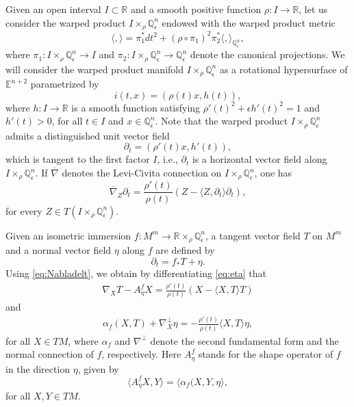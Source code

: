 \documentclass[11pt,a4paper]{article}
\numberwithin{equation}{section}
\newcommand{\R}{\mathbb{R}}
\newcommand{\Q}{\mathbb{Q}}
\newcommand{\E}{\mathbb{E}}
\newcommand{\e}{\epsilon}
\newcommand{\pie}{\langle}
\newcommand{\pid}{\rangle}
\newcommand{\WP}{\R\times_{\rho}\Q^n_{\epsilon}}
\newcommand{\IWP}{I\times_{\rho}\Q^n_{\epsilon}}
\newcommand{\co}{\colon}
\newcommand{\dt}{\partial_t}
\newcommand{\al}{\alpha}
\newcommand{\np}{\nabla^\perp}
\newcommand{\nb}{\overline\nabla}
\begin{document}
Given an open interval $I\subset\R$ and a smooth positive function $\rho\co I\to\R$, let us consider the warped product $\IWP$ endowed with the warped product metric
\[
\pie,\pid = \pi_1^\ast dt^2 + (\rho\circ\pi_1)^2\pi_2^\ast
\pie,\pid_{\Q^n_\e},
\]
where $\pi_1\co\IWP\to I$ and $\pi_2\co\IWP\to\Q^n_\e$ denote the canonical projections. We will consider the warped product manifold $\IWP$ as a rotational hypersurface of $\E^{n+2}$ parametrized by
\begin{equation} \label{eq:inclusion_i}
i(t,x) = (\rho(t)x,h(t)),    
\end{equation}
where $h\co I\to\R$ is a smooth function satisfying $\rho'(t)^2+\e h'(t)^2=1$ and $h'(t)>0$, for all $t\in I$ and $x\in\Q^n_\e$. Note that the warped product $\IWP$ admits a distinguished unit vector field
\[
\dt=(\rho'(t)x,h'(t)),
\]
which is tangent to the first factor $I$, i.e., $\dt$ is a horizontal vector field along $\IWP$. If $\nb$ denotes the Levi-Civita connection on $\IWP$, one has
\begin{equation} \label{eq:Nabladelt}
\nb_Z\dt = \frac{\rho'(t)}{\rho(t)}\left(Z-\pie Z,
\dt\pid\dt\right),
\end{equation}
for every $Z\in T(\IWP)$.

\vspace{.2cm}

Given an isometric immersion $f\co M^m\to\WP$, a tangent vector field $T$ on $M^m$ and a normal vector field $\eta$ along $f$ are defined by
\begin{equation} \label{eq:eta}
\partial_t= f_{\ast} T+\eta.    
\end{equation}
Using \eqref{eq:Nabladelt}, we obtain by differentiating \eqref{eq:eta} that
\begin{eqnarray} \label{eq:derT}
\nabla_XT - A^f_\eta X = \frac{\rho'(t)}{\rho(t)}
\left(X-\langle X,T\rangle T\right)
\end{eqnarray}
and
\begin{eqnarray} \label{eq:dereta}
\al_f(X,T) + \nabla^{\perp}_X\eta = -\frac{\rho'(t)}{\rho(t)}
\langle X,T\rangle\eta,
\end{eqnarray}
for all $X\in TM$, where $\alpha_f$ and $\np$ denote the second fundamental form and the normal connection of $f$, respectively. Here $A^f_\eta$ stands for the shape operator of $f$ in the
direction $\eta$, given by
\[
\pie A^f_\eta X,Y\pid = \pie\al_f(X,Y,\eta\pid,
\]
for all $X,Y\in TM$.
\end{document}
